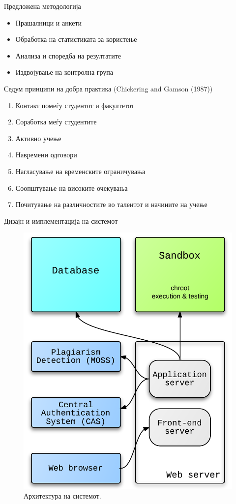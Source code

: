 \begin{frame}{Предложена методологија}
    \begin{itemize}
      \item Прашалници и анкети
      \item Обработка на статистиката за користење
      \item Анализа и споредба на резултатите 
      \item Издвојување на контролна група
    \end{itemize}
    Седум принципи на добра практика (Chickering
and Gamson (1987))
    \begin{enumerate}
      \item Контакт помеѓу студентот и факултетот
      \item Соработка меѓу студентите
      \item Активно учење
      \item Навремени одговори
      \item Нагласување на временските ограничувања
      \item Соопштување на високите очекувања
      \item Почитување на различностите во талентот и начините на учење
    \end{enumerate}
\end{frame}

\begin{frame}{Дизајн и имплементација на системот}
    \begin{figure}
    \centering
        \includegraphics[width=.35\textwidth]{images/architecture-new}
        \caption{Архитектура на системот.}
        \label{fig:architecture}
    \end{figure}
\end{frame}

